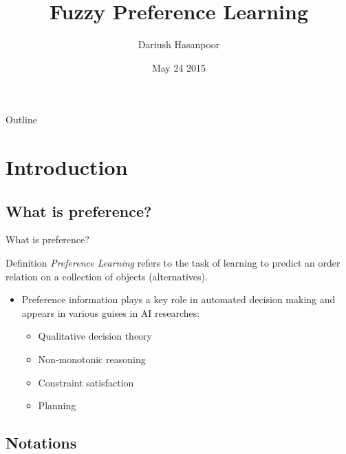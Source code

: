 \documentclass[]{beamer}
\title[Fuzzy Preference Learning]{Fuzzy Preference Learning}
\author[]{Dariush Hasanpoor}
\institute[]{Isfahan University Of Technology}
\date[]{May 24 2015}
\newcommand{\Cpl}{\emph{Preference Learning} }
\newcommand{\Xtri}{$\blacktriangleright$ }
\newcommand{\itemXtri}{\item[\Xtri]}
\renewcommand{\|}[1][.3em]{\hspace{#1}|\hspace{#1}}
\renewcommand{\,}[1][.3em]{,\hspace{#1}}
\begin{document}
\begin{frame}
  \titlepage
\end{frame}

\begin{frame}{Outline}
  \tableofcontents[hideallsubsections]
\end{frame}

\section{Introduction}
\frame{\tableofcontents[currentsection]}
\subsection{What is preference?}

\begin{frame}{What is preference?}

	\begin{block}{Definition}
	\Cpl refers to the task of learning to predict an order relation on a collection of objects (alternatives).
	\end{block}
    \begin{itemize}
    \item Preference information plays a key role in automated decision making and appears in various guises in AI researches:
        \begin{itemize}
        \itemXtri Qualitative decision theory
        \itemXtri Non-monotonic reasoning
        \itemXtri Constraint satisfaction
        \itemXtri Planning
        \end{itemize}
    \end{itemize}
\end{frame}

\subsection{Notations}
\end{document}
